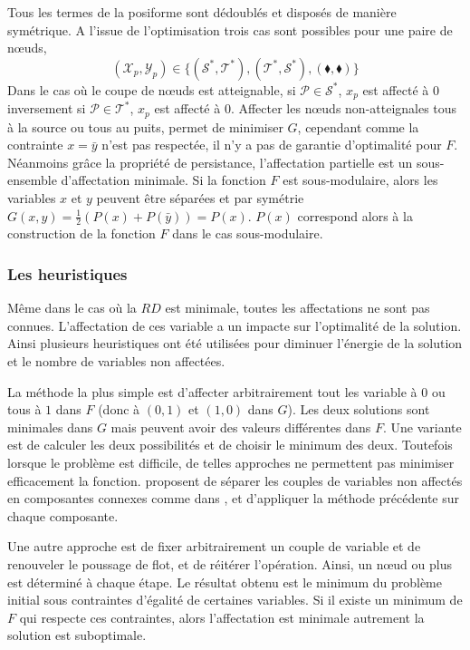 \documentclass[../main/These_Mathias_Paget.tex]{subfiles}
\begin{document}
	Tous les termes de la posiforme sont dédoublés et disposés de manière symétrique. A l'issue de l'optimisation trois cas sont possibles pour une paire de nœuds,
	\begin{equation}
	(\mathcal{X}_p,\mathcal{Y}_p) \in \{(\boldsymbol{\mathcal{S}^*}, \boldsymbol{\mathcal{T}^*}),(\boldsymbol{\mathcal{T}^*}, \boldsymbol{\mathcal{S}^*}),(\blacklozenge, \blacklozenge) \}
	\end{equation}
	Dans le cas où le coupe de nœuds est atteignable, si $\mathcal{P} \in \boldsymbol{\mathcal{S}^*}$, $x_p$ est affecté à $0$ inversement si $\mathcal{P} \in \boldsymbol{\mathcal{T}^*}$, $x_p$ est affecté à $0$. Affecter les nœuds non-atteignales tous à la source ou tous au puits, permet de minimiser $G$, cependant comme la contrainte $x=\bar{y}$ n'est pas respectée, il n'y a pas de garantie d'optimalité pour $F$. Néanmoins grâce la propriété de persistance, l'affectation partielle est un sous-ensemble d'affectation minimale.  Si la fonction $F$ est sous-modulaire, alors les variables $x$ et $y$ peuvent être séparées et par symétrie $G(x,y)=\frac{1}{2}(P(x)+P(\bar{y}))=P(x)$. $P(x)$ correspond alors à la construction de la fonction $F$ dans le cas sous-modulaire.
	
	\subsubsection{Les heuristiques}
	Même dans le cas où la $RD$ est minimale, toutes les affectations ne sont pas connues. L'affectation de ces variable a un impacte sur l'optimalité de la solution. Ainsi plusieurs heuristiques ont été utilisées pour diminuer l’énergie de la solution et le nombre de variables non affectées.
	
	La méthode la plus simple est d'affecter arbitrairement tout les variable à $0$ ou tous à $1$ dans $F$ (donc à $(0,1)$ et $(1,0)$ dans $G$). Les deux solutions sont minimales dans $G$ mais peuvent avoir des valeurs différentes dans $F$. Une variante est de calculer les deux possibilités et de choisir le minimum des deux. Toutefois lorsque le problème est difficile, de telles approches ne permettent pas minimiser efficacement la fonction. \cite{Woodford09PAMI} proposent de séparer les couples de variables non affectés en composantes connexes comme dans \citep{Billionnet89}, et d'appliquer la méthode précédente sur chaque composante.
	
	Une autre approche est de fixer arbitrairement un couple de variable et de renouveler le poussage de flot, et de réitérer l'opération. Ainsi, un nœud ou plus est déterminé à chaque étape. Le résultat obtenu est le minimum du problème initial sous contraintes d'égalité de certaines variables. Si il existe un minimum de $F$ qui respecte ces contraintes, alors l'affectation est minimale autrement la solution est suboptimale.
	
\end{document}
